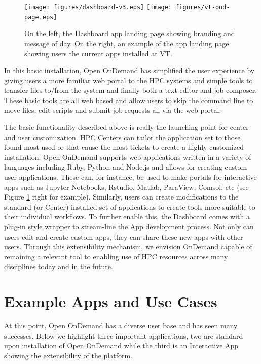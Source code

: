 \documentclass[runningheads]{llncs}
\begin{document}
\begin{figure}[H]
\centering
\texttt{[image: figures/dashboard-v3.eps]}
\hfill %
\texttt{[image: figures/vt-ood-page.eps]}
\caption{On the left, the Dashboard app landing page showing branding and message of day.  On the right, an example of the app landing page showing users the current apps installed at VT. } \label{fig-dshapp}
\end{figure}

In this basic installation, Open OnDemand has simplified the user experience by giving users a more familiar web portal to the HPC systems and simple tools to transfer files to/from the system and finally both a text editor and job composer.  These basic tools are all web based and allow users to skip the command line to move files, edit scripts and submit job requests all via the web portal.  

The basic functionality described above is really the launching point for center and user customization.  HPC Centers can tailor the application set to those found most used or that cause the most tickets to create a highly customized installation.  Open OnDemand supports web applications written in a variety of languages including Ruby, Python and Node.js and allows for creating custom user applications.  These can, for instance, be used to make portals for interactive apps such as Jupyter Notebooks, Rstudio, Matlab, ParaView, Comsol, etc (see Figure \ref{fig-dshapp} right for example).  Similarly, users can create modifications to the standard (or Center) installed set of applications to create tools more suitable to their individual workflows.  To further enable this, the Dashboard comes with a plug-in style wrapper to stream-line the App development process.  Not only can users edit and create custom apps, they can share these new apps with other users.  Through this extensibility mechanism, we envision OnDemand capable of remaining a relevant tool to enabling use of HPC resources across many disciplines today and in the future.  

\section{Example Apps and Use Cases}

At this point, Open OnDemand has a diverse user base and has seen many successes.  Below we highlight three important applications, two are standard upon installation of Open OnDemand while the third is an Interactive App showing the extensibility of the platform.
\end{document}

